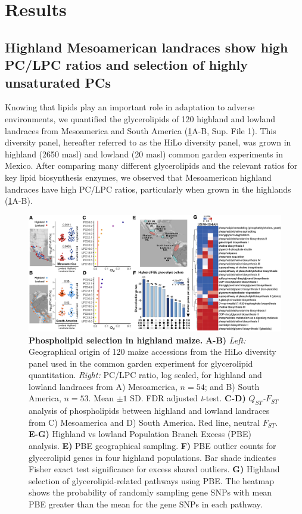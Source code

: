 \documentclass[9pt,twocolumn,twoside,lineno]{biorxiv}
\begin{document}
\section{Results}
\label{sec:results}
\subsection{Highland Mesoamerican landraces show high PC/LPC ratios and selection of highly unsaturated PCs}
Knowing that lipids play an important role in adaptation to adverse environments, we quantified the glycerolipids of 120 highland and lowland landraces from Mesoamerica and South America (\cref{Fig1}A-B, Sup. File 1). 
This  diversity panel, hereafter referred to as the HiLo diversity panel, was grown in highland (2650 masl) and lowland (20 masl) common garden experiments in Mexico.
After comparing many different glycerolipids and the relevant ratios for key lipid biosynthesis enzymes, we observed that Mesoamerican highland landraces have high PC/LPC ratios, particularly when grown in the highlands (\cref{Fig1}A-B).

\begin{figure}[htp]
\centering
\includegraphics[width=0.8\paperwidth]{Figures/Fig_1.png}
\caption{\textbf{Phospholipid selection in highland maize.} 
\textbf{A-B)} \textit{Left:} Geographical origin of 120 maize accessions from the HiLo diversity panel used in the common garden experiment for glycerolipid quantitation.
\textit{Right:} PC/LPC ratio, log scaled, for highland and lowland landraces from A) Mesoamerica, $n=54$; and B) South America, $n=53$.
Mean $\pm 1$ SD. FDR adjusted \textit{t}-test. \textbf{C-D)}
\textit{$Q_{ST}$-$F_{ST}$} analysis of phospholipids between highland and lowland landraces from C) Mesoamerica  and D) South America. 
Red line, neutral $F_{ST}$.
\textbf{E-G)} Highland vs lowland Population Branch Excess (PBE) analysis.
\textbf{E)} PBE geographical sampling.
\textbf{F)} PBE outlier counts for glycerolipid genes in four highland populations.
Bar shade indicates Fisher exact test significance for excess shared outliers. 
\textbf{G)} Highland selection of glycerolipid-related pathways using PBE. The heatmap shows the probability of randomly sampling gene SNPs with mean PBE greater than the mean for the gene SNPs in each pathway.}
\label{Fig1}
\end{figure}
\end{document}
